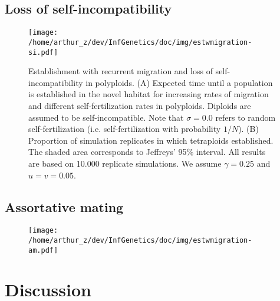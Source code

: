 \documentclass[11pt,a4paper]{article}
\begin{document}
\subsection*{Loss of self-incompatibility}


\begin{figure}
\centering
\texttt{[image: /home/arthur\_z/dev/InfGenetics/doc/img/estwmigration-si.pdf]}
\caption{
Establishment with recurrent migration and loss of self-incompatibility in
polyploids.
(A) Expected time until a population is established in the novel habitat for
increasing rates of migration and different self-fertilization rates in
polyploids. Diploids are assumed to be self-incompatible.
Note that $\sigma=0.0$ refers to random self-fertilization (i.e.
self-fertilization with probability $1/N$). 
(B) Proportion of simulation replicates in which tetraploids established. 
The shaded area corresponds to Jeffreys' 95\% interval.
All results are based on 10.000 replicate simulations.
We assume $\gamma=0.25$ and $u=v=0.05$.
\label{fig:}}
\end{figure}


\subsection*{Assortative mating}

\begin{figure}
\texttt{[image: /home/arthur\_z/dev/InfGenetics/doc/img/estwmigration-am.pdf]}
\caption{
\label{fig:}}
\end{figure}

\section*{Discussion}




\end{document}

